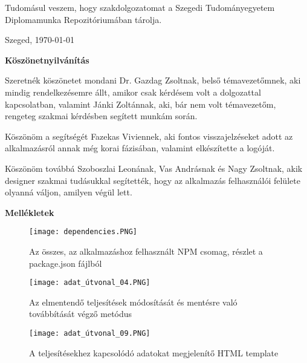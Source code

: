 \documentclass[a4paper,12pt]{report}
\begin{document}
Tudomásul veszem, hogy szakdolgozatomat a Szegedi Tudományegyetem Diplomamunka Repozitóriumában tárolja.

\begin{flushleft}
    \vspace*{1cm}
    Szeged, \today
\end{flushleft}

\begin{flushright}
\end{flushright}


\newpage
{\Huge \bf Köszönetnyilvánítás}


\vspace{2 cm}

Szeretnék köszönetet mondani Dr. Gazdag Zsoltnak, belső témavezetőmnek, aki mindig rendelkezésemre állt, amikor csak kérdésem volt a dolgozattal kapcsolatban, valamint Jánki Zoltánnak, aki, bár nem volt témavezetőm, rengeteg szakmai kérdésben segített munkám során.

Köszönöm a segítségét Fazekas Viviennek, aki fontos visszajelzéseket adott az alkalmazásról annak még korai fázisában, valamint elkészítette a logóját.

Köszönöm továbbá Szoboszlai Leonának, Vas Andrásnak és Nagy Zsoltnak, akik designer szakmai tudásukkal segítették, hogy az alkalmazás felhasználói felülete olyanná váljon, amilyen végül lett.


\newpage
{\Huge \bf Mellékletek}


\vspace{2 cm}

\begin{figure}[h]
    \centering
    \texttt{[image: dependencies.PNG]}
    \caption{Az összes, az alkalmazáshoz felhasznált NPM csomag, részlet a package.json fájlból}
    \label{fig:dependencies}
\end{figure}

\begin{figure}[h]
    \centering
    \texttt{[image: adat\_útvonal\_04.PNG]}
    \caption{Az elmentendő teljesítések módosítását és mentésre való továbbítását végző metódus}
    \label{fig:CompletionsService.saveUniversityCompletions}
\end{figure}

\begin{figure}[h]
    \centering
    \texttt{[image: adat\_útvonal\_09.PNG]}
    \caption{A teljesítésekhez kapcsolódó adatokat megjelenítő HTML template}
    \label{fig:MajorCompletionComponentTemplate}
\end{figure}
\end{document}
